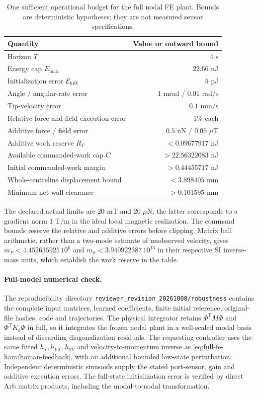\begin{table}[t]
\centering\small
\caption{One sufficient operational budget for the full nodal FE plant.
Bounds are deterministic hypotheses; they are not measured sensor specifications.}
\label{tab:operational-tolerances}
\setlength{\tabcolsep}{3pt}
\begin{tabular}{lr}
\hline
Quantity & Value or outward bound\\
\hline
Horizon $T$ & $4$ s\\
Energy cap $E_{\max}$ & $22.66$ nJ\\
Initialization error $\mathcal E_{\rm init}$ & $5$ pJ\\
Angle / angular-rate error & $1$ mrad / $0.01$ rad/s\\
Tip-velocity error & $0.1$ mm/s\\
Relative force and field execution error & $1\%$ each\\
Additive force / field error & $0.5$ nN / $0.05$ $\mu$T\\
Additive work reserve $R_T$ & $<0.09677917$ nJ\\
Available commanded-work cap $C$ & $>22.56322083$ nJ\\
Initial commanded-work margin & $>0.44455717$ nJ\\
Whole-centreline displacement bound & $<3.898405$ mm\\
Minimum net wall clearance & $>0.101595$ mm\\
\hline
\end{tabular}
\end{table}
The declared actual limits are $20$ mT and $20$ $\mu$N; the latter
corresponds to a gradient norm $1$ T/m in the ideal local magnetic
realization. The command bounds reserve the relative and additive errors
before clipping. Matrix ball arithmetic, rather than a two-mode estimate
of unobserved velocity, gives $m_F<4.452635925\,10^6$ and
$m_\vartheta<3.940922387\,10^{13}$ in their respective SI inverse-mass
units, which establish the work reserve in the table.

\paragraph{Full-model numerical check.}
The reproducibility directory
\texttt{reviewer\_revision\_20261008/robustness} contains the complete
input matrices, learned coefficients, finite initial reference, original-file
hashes, code and trajectories. The physical integrator retains
$\Phi^{\mathsf T}M\Phi$ and $\Phi^{\mathsf T}K_b\Phi$ in full, so it
integrates the frozen nodal plant in a well-scaled modal basis instead of
discarding diagonalization residuals. The requesting controller uses the
same fitted $h_Y,h_{YX},h_{YY}$ and velocity-to-momentum inverse as
\eqref{eq:full-fe-hamiltonian-feedback}, with an additional bounded
low-state perturbation. Independent deterministic sinusoids supply the
stated port-sensor, gain and additive execution errors. The full-state
initialization error is verified by direct Arb matrix products, including
the modal-to-nodal transformation.


